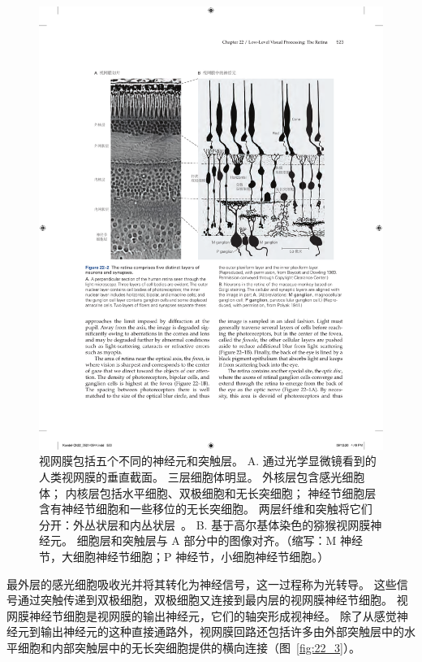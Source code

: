 \begin{figure}[htbp]
	\centering
	\includegraphics[width=1.0\linewidth]{chap22/fig_22_2}
	\caption{视网膜包括五个不同的神经元和突触层。
		A. 通过光学显微镜看到的人类视网膜的垂直截面。
		三层细胞体明显。
		外核层包含感光细胞体； 内核层包括水平细胞、双极细胞和无长突细胞； 神经节细胞层含有神经节细胞和一些移位的无长突细胞。
		两层纤维和突触将它们分开：外丛状层和内丛状层~\cite{boycott1969organization}。
		B. 基于高尔基体染色的猕猴视网膜神经元。
		细胞层和突触层与 A 部分中的图像对齐\cite{polyak1941retina}。（缩写：M 神经节，大细胞神经节细胞；P 神经节，小细胞神经节细胞。）}
	\label{fig:22_2}
\end{figure}


最外层的感光细胞吸收光并将其转化为神经信号，这一过程称为光转导。
这些信号通过突触传递到双极细胞，双极细胞又连接到最内层的视网膜神经节细胞。
视网膜神经节细胞是视网膜的输出神经元，它们的轴突形成视神经。
除了从感觉神经元到输出神经元的这种直接通路外，视网膜回路还包括许多由外部突触层中的水平细胞和内部突触层中的无长突细胞提供的横向连接（图~\ref{fig:22_3}）。


